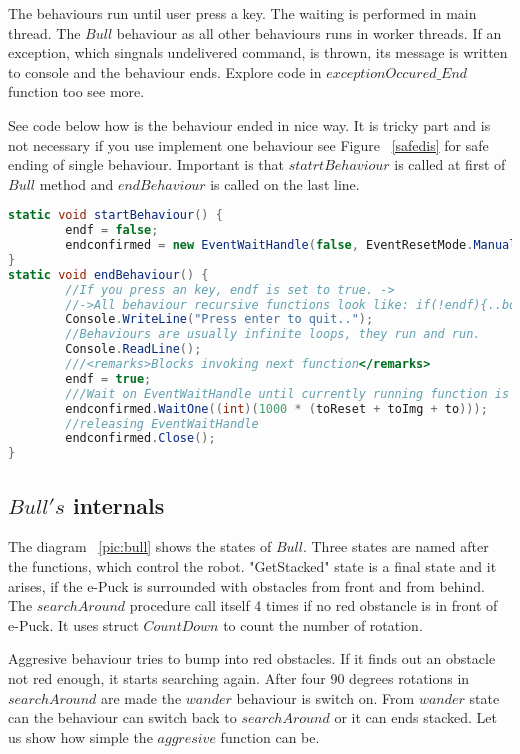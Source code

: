 	The behaviours run until user press a key. The waiting is performed in main thread. The $Bull$ behaviour as all other behaviours runs in worker threads.
	If an exception, which singnals undelivered command, is thrown, its message is written to console and the behaviour ends. 
	Explore code in $exceptionOccured\_End$ function too see more.

	See code below how is the behaviour ended in nice way. It is tricky part and is not necessary if you use implement one behaviour see Figure ~\ref{safedis}
	for safe ending of single behaviour.
	Important is that $statrtBehaviour$ is called at first of $Bull$ method and $endBehaviour$ is called on the last line.
\begin{lstlisting}[language=cs]
static void startBehaviour() {
        endf = false;
        endconfirmed = new EventWaitHandle(false, EventResetMode.ManualReset);
}
static void endBehaviour() {        
        //If you press an key, endf is set to true. ->
        //->All behaviour recursive functions look like: if(!endf){..body..}else endconfirmed.Set();
        Console.WriteLine("Press enter to quit..");
        //Behaviours are usually infinite loops, they run and run.
        Console.ReadLine();
        ///<remarks>Blocks invoking next function</remarks>
        endf = true;
        ///Wait on EventWaitHandle until currently running function is finished.
        endconfirmed.WaitOne((int)(1000 * (toReset + toImg + to)));
        //releasing EventWaitHandle
        endconfirmed.Close();
}
\end{lstlisting}

\subsection{$Bull's$ internals} \label{bull}
	The diagram ~\ref{pic:bull} shows the states of $Bull$.
	Three states are named after the functions, which control the robot. "GetStacked" state
	is a final state and it arises, if the e-Puck is surrounded with obstacles from front and from behind.
	The $searchAround$ procedure call itself 4 times if no red obstancle is in front of e-Puck.
	It uses struct $CountDown$ to count the number of rotation.

	Aggresive behaviour tries to bump into red obstacles. If it finds out an obstacle not red enough, it
	starts searching again. After four 90 degrees rotations in $searchAround$ are made the $wander$ behaviour is switch on.
	From $wander$ state can the behaviour can switch back to $searchAround$ or it can ends stacked.
	Let us show how simple the $aggresive$ function can be.

